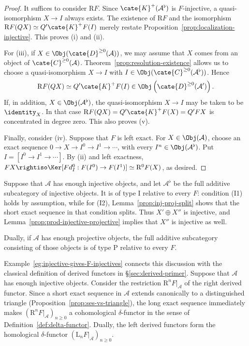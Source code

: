 \begin{proof}
	It suffices to consider $\mathrm{R}F$. Since
	$\cate{K}^+(\mathcal{A}^\flat)$ is $F$-injective, a quasi-isomorphism
	$X\to I$ always exists. The existence of $\mathrm{R}F$ and the isomorphism
	$\mathrm{R}F(QX)\simeq Q'\cate{K}^+F(I)$ merely restate
	Proposition~\ref{prop:localization-injective}. This proves (i) and (ii).

	For (iii), if $X\in\Obj(\cate{D}^{\geq0}(\mathcal{A}))$, we may assume
	that $X$ comes from an object of $\cate{C}^{\geq0}(\mathcal{A})$.
	Theorem~\ref{prop:resolution-existence} allows us to choose a
	quasi-isomorphism $X\to I$ with
	$I\in\Obj(\cate{C}^{\geq0}(\mathcal{A}^\flat))$. Hence
	\[ \mathrm{R}F(QX) \simeq Q' \cate{K}^+ F(I) \in \Obj\left( \cate{D}^{\geq 0}(\mathcal{A}')\right). \]
	If, in addition, $X\in\Obj(\mathcal{A}^\flat)$, the quasi-isomorphism
	$X\to I$ may be taken to be $\identity_X$. In that case
	$\mathrm{R}F(QX)=Q'\cate{K}^+F(X)=Q'FX$ is concentrated in degree zero.
	This also proves (v).

	Finally, consider (iv). Suppose that $F$ is left exact. For
	$X\in\Obj(\mathcal{A})$, choose an exact sequence
	$0\to X\to I^0\to I^1\to\cdots$, with every
	$I^n\in\Obj(\mathcal{A}^\flat)$. Put $I=[I^0\to I^1\to\cdots]$.
	By (ii) and left exactness,
	$FX\rightiso\Ker[Fd_I^0:F(I^0)\to F(I^1)]
	\simeq\mathrm{R}^0F(X)$, as desired.
\end{proof}

\begin{example}\label{eg:injective-gives-F-injectives}
	Suppose that $\mathcal{A}$ has enough injective objects, and let
	$\mathcal{A}^\flat$ be the full additive subcategory of injective objects.
	It is of type I relative to every $F$: condition (I1) holds by assumption,
	while for (I2), Lemma~\ref{prop:inj-proj-split} shows that the short exact
	sequence in that condition splits. Thus $X'\oplus X''$ is injective, and
	Lemma~\ref{prop:prod-injective-projective} implies that $X''$ is injective
	as well.

	Dually, if $\mathcal{A}$ has enough projective objects, the full additive
	subcategory consisting of those objects is of type P relative to every $F$.
\end{example}

Example~\ref{eg:injective-gives-F-injectives} connects this discussion with
the classical definition of derived functors in \S\ref{sec:derived-primer}.
Suppose that $\mathcal{A}$ has enough injective objects. Consider the
restriction $\mathrm{R}^nF|_{\mathcal{A}}$ of the right derived functor. Since
a short exact sequence in $\mathcal{A}$ extends canonically to a distinguished
triangle (Proposition~\ref{prop:ses-vs-triangle}), the long exact sequence
immediately makes $(\mathrm{R}^nF|_{\mathcal{A}})_{n\geq0}$ a cohomological
$\delta$-functor in the sense of Definition~\ref{def:delta-functor}. Dually,
the left derived functors form the homological $\delta$-functor
$(\mathrm{L}_nF|_{\mathcal{A}})_{n\geq0}$.

